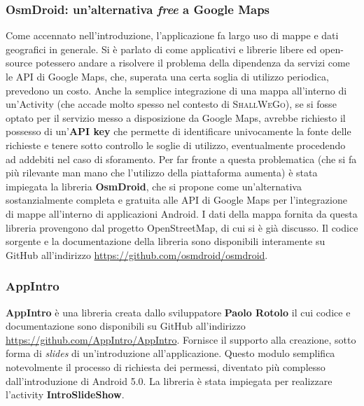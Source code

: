                 \subsubsection{OsmDroid: un'alternativa \textit{free} a Google Maps}
                    Come accennato nell'introduzione, l'applicazione fa largo uso di mappe e dati geografici in generale. Si è parlato di come applicativi e librerie libere ed open-source potessero andare a risolvere il problema della dipendenza da servizi come le API di Google Maps, che, superata una certa soglia di utilizzo periodica, prevedono un costo. Anche la semplice integrazione di una mappa all'interno di un'Activity (che accade molto spesso nel contesto di \textsc{ShallWeGo}), se si fosse optato per il servizio messo a disposizione da Google Maps, avrebbe richiesto il possesso di un'\textbf{API key} che permette di identificare univocamente la fonte delle richieste e tenere sotto controllo le soglie di utilizzo, eventualmente procedendo ad addebiti nel caso di sforamento. Per far fronte a questa problematica (che si fa più rilevante man mano che l'utilizzo della piattaforma aumenta) è stata impiegata la libreria \textbf{OsmDroid}, che si propone come un'alternativa sostanzialmente completa e gratuita alle API di Google Maps per l'integrazione di mappe all'interno di applicazioni Android. I dati della mappa fornita da questa libreria provengono dal progetto OpenStreetMap, di cui si è già discusso. Il codice sorgente e la documentazione della libreria sono disponibili interamente su GitHub all'indirizzo \url{https://github.com/osmdroid/osmdroid}.

                \subsubsection{AppIntro}
                    \textbf{AppIntro} è una libreria creata dallo sviluppatore \textbf{Paolo Rotolo} il cui codice e documentazione sono disponibili su GitHub all'indirizzo \url{https://github.com/AppIntro/AppIntro}. Fornisce il supporto alla creazione, sotto forma di \textit{slides} di un'introduzione all'applicazione. Questo modulo semplifica notevolmente il processo di richiesta dei permessi, diventato più complesso dall'introduzione di Android 5.0.
                    La libreria è stata impiegata per realizzare l'activity \textbf{IntroSlideShow}.

